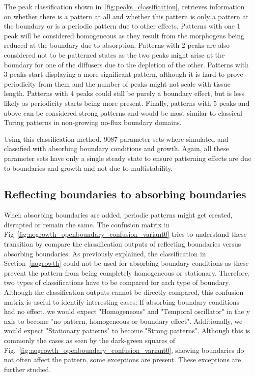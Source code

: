 The peak classification shown in~\ref{fig:peaks_classification}, retrieves information on whether there is a pattern at all and whether this pattern is only a pattern at the boundary or is a periodic pattern due to other effects.
Patterns with one 1 peak will be considered homogeneous as they result from the morphogens being reduced at the boundary due to absorption.
Patterns with 2 peaks are also considered not to be patterned states as the two peaks might arise at the boundary for one of the diffusers due to the depletion of the other.
Patterns with 3 peaks start displaying a more significant pattern, although it is hard to prove periodicity from them and the number of peaks might not scale with tissue length.
Patterns with 4 peaks could still be purely a boundary effect, but is less likely as periodicity starts being more present.
Finally, patterns with 5 peaks and above can be considered strong patterns and would be most similar to classical Turing patterns in non-growing no-flux boundary domains.


Using this classification method, 9087 parameter sets where simulated and classified with absorbing boundary conditions and growth.
Again, all these parameter sets have only a single steady state to ensure patterning effects are due to boundaries and growth and not due to multistability.


\subsection{Reflecting boundaries to absorbing boundaries}
When absorbing boundaries are added, periodic patterns might get created, disrupted or remain the same.
The confusion matrix in Fig~\ref{fig:nogrowth_openboundary_confusion_variant0} tries to understand these transition by compare the classification outputs of reflecting boundaries versus absorbing boundaries.
As previously explained, the classification in Section~\ref{nogrowth} could not be used for absorbing boundary conditions as these prevent the pattern from being completely homogeneous or stationary.
Therefore, two types of classifications have to be compared for each type of boundary.
Although the classification outputs cannot be directly compared, this confusion matrix is useful to identify interesting cases:
If absorbing boundary conditions had no effect, we would expect "Homogeneous" and "Temporal oscillator" in the y axis to become "no pattern, homogeneous or boundary effect".
Additionally, we would expect "Stationary patterns" to become "Strong patterns".
Although this is commonly the cases as seen by the dark-green squares of Fig.~\ref{fig:nogrowth_openboundary_confusion_variant0}, showing boundaries do not often affect the pattern, some exceptions are present.
These exceptions are further studied.

